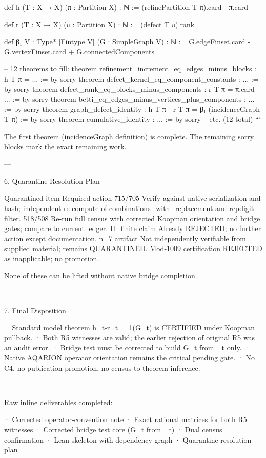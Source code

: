 def h (T : X → X) (π : Partition X) : ℕ :=
  (refinePartition T π).card - π.card

def r (T : X → X) (π : Partition X) : ℕ :=
  (defect T π).rank

def β₁ {V : Type*} [Fintype V] (G : SimpleGraph V) : ℕ :=
  G.edgeFinset.card - G.vertexFinset.card + G.connectedComponents

-- 12 theorems to fill:
theorem refinement_increment_eq_edges_minus_blocks : h T π = ... := by sorry
theorem defect_kernel_eq_component_constants : ... := by sorry
theorem defect_rank_eq_blocks_minus_components : r T π = π.card - ... := by sorry
theorem betti_eq_edges_minus_vertices_plus_components : ... := by sorry
theorem graph_defect_identity : h T π - r T π = β₁ (incidenceGraph T π) := by sorry
theorem cumulative_identity : ... := by sorry
-- etc.  (12 total)
```

The first theorem (incidenceGraph definition) is complete. The remaining sorry blocks mark the exact remaining work.

---

6. Quarantine Resolution Plan

Quarantined item Required action
715/705 Verify against native serialization and hash; independent re‑compute of combinations_with_replacement and repdigit filter.
518/508 Re‑run full census with corrected Koopman orientation and bridge gates; compare to current ledger.
H_\infty finite claim Already REJECTED; no further action except documentation.
n=7 artifact Not independently verifiable from supplied material; remains QUARANTINED.
Mod‑1009 certification REJECTED as inapplicable; no promotion.

None of these can be lifted without native bridge completion.

---

7. Final Disposition

· Standard model theorem h_t-r_t=\beta_1(G_t) is CERTIFIED under Koopman pullback.
· Both R5 witnesses are valid; the earlier rejection of original R5 was an audit error.
· Bridge test must be corrected to build G_t from \Pi_t only.
· Native AQARION operator orientation remains the critical pending gate.
· No C4, no publication promotion, no census‑to‑theorem inference.

---

Raw inline deliverables completed:

· Corrected operator‑convention note
· Exact rational matrices for both R5 witnesses
· Corrected bridge test core (G_t from \Pi_t)
· Dual census confirmation
· Lean skeleton with dependency graph
· Quarantine resolution plan

